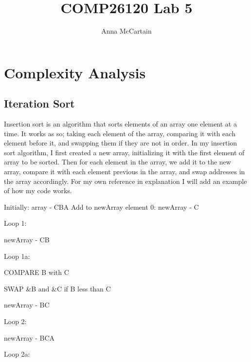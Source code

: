\documentclass{article}
\title{COMP26120 Lab 5}
\author{Anna McCartain}
\begin{document}
\maketitle


\section{Complexity Analysis}
\label{sec:complexity}


\subsection{Iteration Sort}

Insertion sort is an algorithm that sorts elements of an array one element at a time. It works as so; taking each element of the array, comparing it with each element before it, and swapping them if they are not in order. In my insertion sort algorithm, I first created a new array, initializing it with the first element of array to be sorted. Then for each element in the array, we add it to the new array, compare it with each element previous in the array, and swap addresses in the array accordingly. For my own reference in explanation I will add an example of how my code works. \newline

Initially: array - CBA \newline
Add to newArray element 0: newArray - C \newline


Loop 1: \newline

	newArray - CB\newline

		Loop 1a:\newline

			COMPARE B with C\newline

			SWAP \&B and \&C if B less than C\newline

			newArray - BC\newline


Loop 2:\newline

	newArray - BCA\newline

		Loop 2a:\newline
\end{document}
